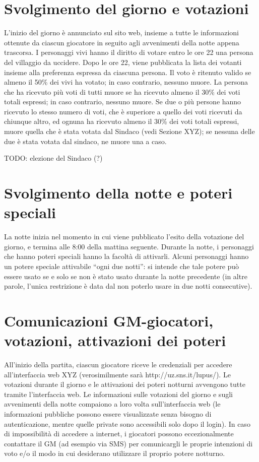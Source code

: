 \documentclass[a4paper,10pt]{article}
\begin{document}
\section{Svolgimento del giorno e votazioni}

L'inizio del giorno è annunciato sul sito web, insieme a tutte le informazioni ottenute da ciascun giocatore in seguito agli avvenimenti della notte appena trascorsa.
I personaggi vivi hanno il diritto di votare entro le ore 22 una persona del villaggio da uccidere. Dopo le ore 22, viene pubblicata la lista dei votanti insieme alla preferenza espressa da ciascuna persona. Il voto è ritenuto valido se almeno il 50\% dei vivi ha votato; in caso contrario, nessuno muore. La persona che ha ricevuto più voti di tutti muore se ha ricevuto almeno il 30\% dei voti totali espressi; in caso contrario, nessuno muore. Se due o più persone hanno ricevuto lo stesso numero di voti, che è superiore a quello dei voti ricevuti da chiunque altro, ed ognuna ha ricevuto almeno il 30\% dei voti totali espressi, muore quella che è stata votata dal Sindaco (vedi Sezione XYZ); se nessuna delle due è stata votata dal sindaco, ne muore una a caso.

TODO: elezione del Sindaco (?)


\section{Svolgimento della notte e poteri speciali}

La notte inizia nel momento in cui viene pubblicato l'esito della votazione del giorno, e termina alle 8:00 della mattina seguente.
Durante la notte, i personaggi che hanno poteri speciali hanno la facoltà di attivarli.
Alcuni personaggi hanno un potere speciale attivabile ``ogni due notti'': si intende che tale potere può essere usato se e solo se non è stato usato durante la notte precedente (in altre parole, l'unica restrizione è data dal non poterlo usare in due notti consecutive).


\section{Comunicazioni GM-giocatori, votazioni, attivazioni dei poteri}

All'inizio della partita, ciascun giocatore riceve le credenziali per accedere all'interfaccia web XYZ (verosimilmente sarà http://uz.sns.it/lupus/).
Le votazioni durante il giorno e le attivazioni dei poteri notturni avvengono tutte tramite l'interfaccia web. Le informazioni sulle votazioni del giorno e sugli avvenimenti della notte compaiono a loro volta sull'interfaccia web (le informazioni pubbliche possono essere visualizzate senza bisogno di autenticazione, mentre quelle private sono accessibili solo dopo il login).
In caso di impossibilità di accedere a internet, i giocatori possono eccezionalmente contattare il GM (ad esempio via SMS) per comunicargli le proprie intenzioni di voto e/o il modo in cui desiderano utilizzare il proprio potere notturno.
\end{document}
